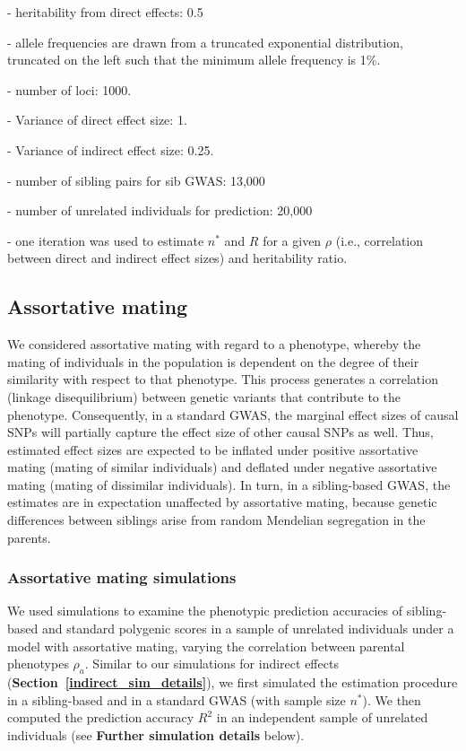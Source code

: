 \documentclass[hidelinks, 12pt]{article}
\begin{document}
- heritability from direct effects: 0.5

- allele frequencies are drawn from a truncated exponential distribution, truncated on the left such that the minimum allele frequency is 1\%.

- number of loci: 1000.

- Variance of direct effect size: 1.

- Variance of indirect effect size: 0.25.

- number of sibling pairs for sib GWAS: 13,000

- number of unrelated individuals for prediction: 20,000

- one iteration was used to estimate $n^*$ and $R$ for a given $\rho$ (i.e., correlation between direct and indirect effect sizes) and heritability ratio.


\pagebreak

\subsection{Assortative mating}
We considered assortative mating with regard to a phenotype, whereby the mating of individuals in the population is dependent on the degree of their similarity with respect to that phenotype.  This process generates a correlation (linkage disequilibrium) between genetic variants that contribute to the phenotype.  Consequently, in a standard GWAS, the marginal effect sizes of causal SNPs will partially capture the effect size of other causal SNPs as well. Thus, estimated effect sizes are expected to be inflated under positive assortative mating (mating of similar individuals) and deflated under negative assortative mating (mating of dissimilar individuals). In turn, in a sibling-based GWAS, the estimates are in expectation unaffected by assortative mating, because genetic differences between siblings arise from random Mendelian segregation in the parents. 

\subsubsection{Assortative mating simulations}
We used simulations to examine the phenotypic prediction accuracies of sibling-based and standard polygenic scores in a sample of unrelated individuals under a model with assortative mating, varying the correlation between parental phenotypes $\rho_a$. Similar to our simulations for indirect effects ({\bf Section~\ref{indirect_sim_details}}), we first simulated the estimation procedure in a sibling-based and in a standard GWAS (with sample size $n^*$). We then computed the prediction accuracy $R^2$ in an independent sample of unrelated individuals (see {\bf Further simulation details} below).\\
\end{document}
